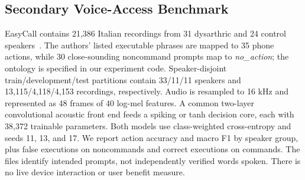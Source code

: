 \documentclass[conference]{IEEEtran}
\begin{document}
\subsection{Secondary Voice-Access Benchmark}
EasyCall contains 21,386 Italian recordings from 31 dysarthric and 24 control speakers~\cite{easycall}. The authors' listed executable phrases are mapped to 35 phone actions, while 30 close-sounding noncommand prompts map to \emph{no\_action}; the ontology is specified in our experiment code. Speaker-disjoint train/development/test partitions contain 33/11/11 speakers and 13,115/4,118/4,153 recordings, respectively. Audio is resampled to 16 kHz and represented as 48 frames of 40 log-mel features. A common two-layer convolutional acoustic front end feeds a spiking or tanh decision core, each with 38,372 trainable parameters. Both models use class-weighted cross-entropy and seeds 11, 13, and 17. We report action accuracy and macro F1 by speaker group, plus false executions on noncommands and correct executions on commands. The files identify intended prompts, not independently verified words spoken. There is no live device interaction or user benefit measure.
\end{document}
